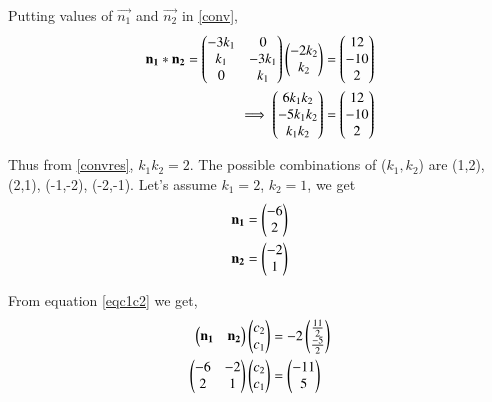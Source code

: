 \documentclass[journal,12pt,twocolumn]{IEEEtran}
\begin{document}
Putting values of $\vec{n_1}$ and $\vec{n_2}$ in \eqref{conv}, 
\begin{align}
    \mathbf{n_1} * \mathbf{n_2} = \begin{pmatrix}-3k_1 & 0 \\ k_1 & -3k_1 \\ 0 & k_1\end{pmatrix}\begin{pmatrix}-2k_2 \\ k_2\end{pmatrix} = \begin{pmatrix}12 \\ -10 \\ 2\end{pmatrix} \\
    \implies\begin{pmatrix}6k_1k_2 \\ -5k_1k_2 \\ k_1k_2 \end{pmatrix} = \begin{pmatrix}12 \\ -10 \\ 2\end{pmatrix}\label{convres} 
\end{align}

Thus from \eqref{convres}, $k_1k_2 = 2$. The possible combinations of ($k_1,k_2$) are (1,2), (2,1), (-1,-2), (-2,-1). 
Let's assume $k_1=2$, $k_2=1$, we get 
\begin{align}
    \mathbf{n_1}&=\begin{pmatrix}-6 \\ 2\end{pmatrix}\label{n11}\\
    \mathbf{n_2}&=\begin{pmatrix}-2 \\ 1\end{pmatrix}\label{n22}
\end{align}
  
From equation \eqref{eqc1c2} we get,  
\begin{align}
    \begin{pmatrix}\mathbf{n_1} & \mathbf{n_2}\end{pmatrix}\begin{pmatrix}c_2\\c_1\end{pmatrix} & =-2\begin{pmatrix}\frac{11}{2}\\\frac{-5}{2}\end{pmatrix} \\
    \begin{pmatrix}-6 & -2 \\2 & 1\end{pmatrix}\begin{pmatrix}c_2\\c_1\end{pmatrix} &= \begin{pmatrix}-11 \\ 5\end{pmatrix} \label{eq:aug}
\end{align}
\end{document}
